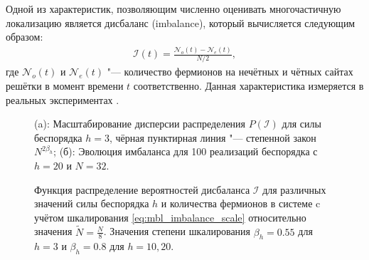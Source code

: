 Одной из характеристик, позволяющим численно оценивать многочастичную локализацию является дисбаланс (imbalance), который вычисляется следующим образом:
\begin{equation}
	\label{eq:mbl_imbalance}
	\begin{gathered}
		\mathcal{I}(t) = \frac{\mathcal{N}_o(t) - \mathcal{N}_e(t)}{N/2},
	\end{gathered}
\end{equation}
где \(\mathcal{N}_o(t)\) и \(\mathcal{N}_e(t)\) "--- количество фермионов на нечётных и чётных сайтах решётки в момент времени \(t\) соответственно. Данная характеристика измеряется в реальных экспериментах \cite{Schreiber2015, Choi2016, Bordia2017, Lschen2017}.
\begin{figure}[h]
	\legend{}
	\caption[Масштабирование дисперсии распределения дисбаланса и его эволюция во времени в модели MBL]
	{
		(a): Масштабирование дисперсии распределения \( P(\mathcal{I}) \) для силы беспорядка \(h=3\), чёрная пунктирная линия "--- степенной закон \(N^{2 \beta_h}\); (б): Эволюция имбаланса для 100 реализаций беспорядка с \(h=20\) и \(N=32\).
	}
	\label{fig:mbl_imbalance_1}
\end{figure}
\begin{figure}[h]
	\caption[Плотность распределения дисбаланса для разных значений беспорядка и разного количества частиц]{
		Функция распределение вероятностей дисбаланса \(\mathcal{I}\) для различных значений силы беспорядка \(h\) и количества фермионов в системе c учётом шкалирования \cref{eq:mbl_imbalance_scale} относительно значения \(\tilde{N} = \frac{N}{8}\). Значения степени шкалирования \(\beta_h = 0.55\) для \(h=3\) и \(\beta_h = 0.8\) для \(h=10, 20\).
	}
	\label{fig:mbl_imbalance_2}
\end{figure}

